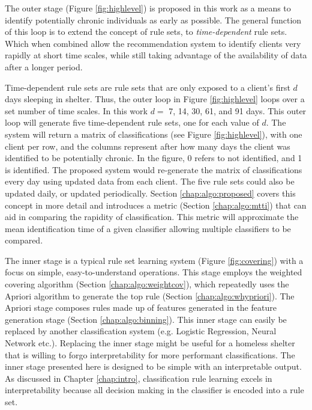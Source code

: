 The outer stage (Figure \ref{fig:highlevel}) is proposed in this work as a means to identify potentially chronic individuals as early as possible. The general function of this loop is to extend the concept of rule sets, to \emph{time-dependent} rule sets. Which when combined allow the \Abb recommendation system to identify clients very rapidly at short time scales, while still taking advantage of the availability of data after a longer period.

Time-dependent rule sets are rule sets that are only exposed to a client's first $d$ days sleeping in shelter. Thus, the outer loop in Figure \ref{fig:highlevel} loops over a set number of time scales. In this work $d =$ 7, 14, 30, 61, and 91 days. This outer loop will generate five time-dependent rule sets, one for each value of $d$. The \Abb system will return a matrix of classifications (see Figure \ref{fig:highlevel}), with one client per row, and the columns represent after how many days the client was identified to be potentially chronic. In the figure, 0 refers to not identified, and 1 is identified. The proposed system would re-generate the matrix of classifications every day using updated data from each client. The five rule sets could also be updated daily, or updated periodically.
Section \ref{chap:algo:proposed} covers this concept in more detail and introduces a metric (Section \ref{chap:algo:mtti}) that can aid in comparing the rapidity of classification. This metric will approximate the mean identification time of a given classifier allowing multiple classifiers to be compared.

The inner stage is a typical rule set learning system (Figure \ref{fig:covering}) with a focus on simple, easy-to-understand operations. This stage employs the weighted covering algorithm (Section \ref{chap:algo:weightcov}), which repeatedly uses the Apriori algorithm to generate the top rule (Section \ref{chap:algo:whypriori}). The Apriori stage composes rules made up of features generated in the feature generation stage (Section \ref{chap:algo:binning}).
This inner stage can easily be replaced by another classification system (e.g. Logistic Regression, Neural Network etc.). Replacing the inner stage might be useful for a homeless shelter that is willing to forgo interpretability for more performant classifications. The inner stage presented here is designed to be simple with an interpretable output. As discussed in Chapter \ref{chap:intro}, classification rule learning excels in interpretability because all decision making in the classifier is encoded into a rule set.

